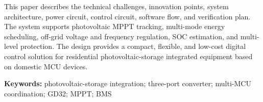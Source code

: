 This paper describes the technical challenges, innovation points, system architecture, power circuit, control circuit, software flow, and verification plan. The system supports photovoltaic MPPT tracking, multi-mode energy scheduling, off-grid voltage and frequency regulation, SOC estimation, and multi-level protection. The design provides a compact, flexible, and low-cost digital control solution for residential photovoltaic-storage integrated equipment based on domestic MCU devices.

\vspace{1em}
\noindent\textbf{Keywords:} photovoltaic-storage integration; three-port converter; multi-MCU coordination; GD32; MPPT; BMS

